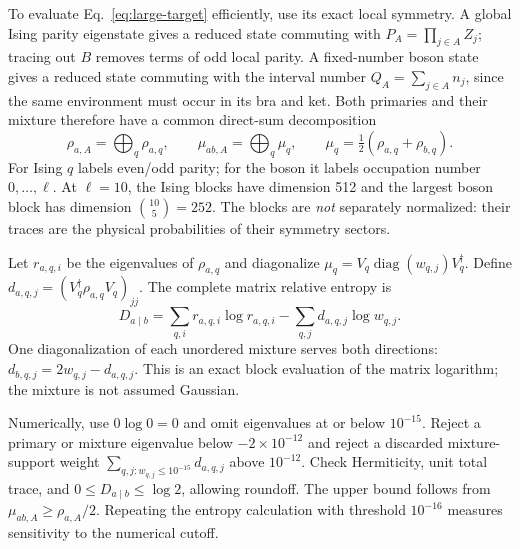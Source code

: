 To evaluate Eq.~\eqref{eq:large-target} efficiently, use its exact local
symmetry. A global Ising parity eigenstate gives a reduced state
commuting with $P_A=\prod_{j\in A}Z_j$; tracing out $B$ removes terms
of odd local parity. A fixed-number boson state gives a reduced state
commuting with the interval number $Q_A=\sum_{j\in A}n_j$, since the
same environment must occur in its bra and ket. Both primaries and
their mixture therefore have a common direct-sum decomposition
\begin{equation}
 \rho_{a,A}=\bigoplus_q\rho_{a,q},\qquad
 \mu_{ab,A}=\bigoplus_q\mu_q,\qquad
 \mu_q=\tfrac12(\rho_{a,q}+\rho_{b,q}).
\end{equation}
For Ising $q$ labels even/odd parity; for the boson it labels occupation
number $0,\ldots,\ell$. At $\ell=10$, the Ising blocks have dimension
512 and the largest boson block has dimension $\binom{10}{5}=252$.
The blocks are \emph{not} separately normalized: their traces are the
physical probabilities of their symmetry sectors.

Let $r_{a,q,i}$ be the eigenvalues of $\rho_{a,q}$ and diagonalize
$\mu_q=V_q\operatorname{diag}(w_{q,j})V_q^\dagger$. Define
$d_{a,q,j}=(V_q^\dagger\rho_{a,q}V_q)_{jj}$. The complete matrix
relative entropy is
\begin{equation}
 D_{a\mid b}=\sum_{q,i}r_{a,q,i}\log r_{a,q,i}
 -\sum_{q,j}d_{a,q,j}\log w_{q,j}.
 \label{eq:large-block-entropy}
\end{equation}
One diagonalization of each unordered mixture serves both directions:
$d_{b,q,j}=2w_{q,j}-d_{a,q,j}$. This is an exact block evaluation of the
matrix logarithm; the mixture is not assumed Gaussian.

Numerically, use $0\log0=0$ and omit eigenvalues at or below $10^{-15}$.
Reject a primary or mixture eigenvalue below $-2\times10^{-12}$ and
reject a discarded mixture-support weight
$\sum_{q,j:w_{q,j}\leq10^{-15}}d_{a,q,j}$ above $10^{-12}$.
Check Hermiticity, unit total trace, and $0\leq D_{a\mid b}\leq\log2$,
allowing roundoff. The upper bound follows from
$\mu_{ab,A}\geq\rho_{a,A}/2$. Repeating the entropy calculation
with threshold $10^{-16}$ measures sensitivity to the numerical cutoff.


